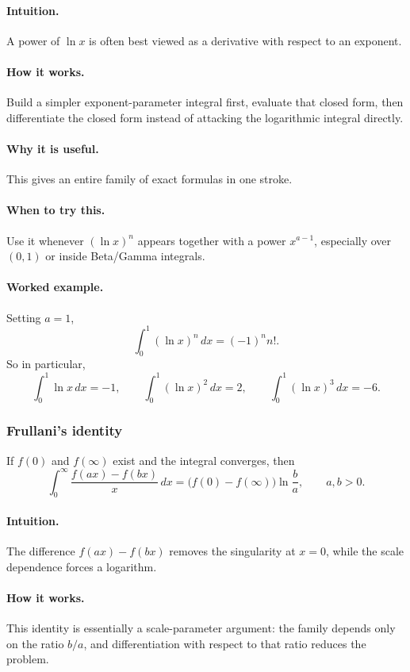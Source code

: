 \documentclass[12pt]{article}
\begin{document}
\paragraph{Intuition.}
A power of \(\ln x\) is often best viewed as a derivative with respect to an exponent.

\paragraph{How it works.}
Build a simpler exponent-parameter integral first, evaluate that closed form, then differentiate the closed form instead of attacking the logarithmic integral directly.

\paragraph{Why it is useful.}
This gives an entire family of exact formulas in one stroke.

\paragraph{When to try this.}
Use it whenever \((\ln x)^n\) appears together with a power \(x^{a-1}\), especially over \((0,1)\) or inside Beta/Gamma integrals.

\paragraph{Worked example.}
Setting \(a=1\),
\[
\int_0^1 (\ln x)^n\,dx=(-1)^n n!.
\]
So in particular,
\[
\int_0^1 \ln x\,dx=-1,
\qquad
\int_0^1 (\ln x)^2\,dx=2,
\qquad
\int_0^1 (\ln x)^3\,dx=-6.
\]

\newpage
\subsubsection{Frullani's identity}
If \(f(0)\) and \(f(\infty)\) exist and the integral converges, then
\[
\int_0^\infty \frac{f(ax)-f(bx)}{x}\,dx
=\bigl(f(0)-f(\infty)\bigr)\ln\frac{b}{a},
\qquad a,b>0.
\]

\paragraph{Intuition.}
The difference \(f(ax)-f(bx)\) removes the singularity at \(x=0\), while the scale dependence forces a logarithm.

\paragraph{How it works.}
This identity is essentially a scale-parameter argument: the family depends only on the ratio \(b/a\), and differentiation with respect to that ratio reduces the problem.
\end{document}
